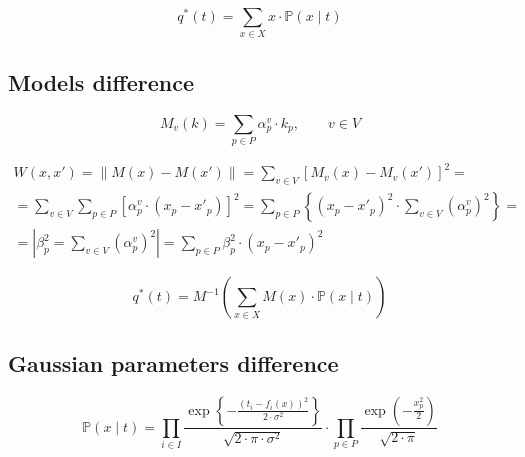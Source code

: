 \begin{equation*}
  q^* \left( t \right)
  = \sum_{x \in X} x \cdot \mathbb{P}\left( x \mid t \right)
\end{equation*}

\subsection{Models difference}

\begin{equation*}
  M_v\left( k \right) = \sum_{p \in P} \alpha_p^v \cdot k_p, \qquad v \in V
\end{equation*}

\begin{equation*}
    \begin{split}
      W \left( x, x' \right)
      = \left\| M\left( x \right) - M\left( x' \right) \right\|
      = \sum_{v \in V} \left[
          M_v\left( x \right) - M_v\left( x' \right)
        \right]^2 = \\
      = \sum_{v \in V} \sum_{p \in P} \left[
          \alpha_p^v \cdot \left( x_p - x'_p \right)
        \right]^2
      = \sum_{p \in P} \left\{ \left( x_p - x'_p \right)^2
        \cdot \sum_{v \in V} \left( \alpha_p^v \right)^2 \right\} = \\
      = \left| \beta_p^2 = \sum_{v \in V} \left( \alpha_p^v \right)^2 \right|
      = \sum_{p \in P}
          \beta_p^2 \cdot \left( x_p - x'_p \right)^2
    \end{split}
\end{equation*}

\begin{equation*}
  q^* \left( t \right)
  = M^{-1} \left(
      \sum_{x \in X} M\left( x \right) \cdot \mathbb{P}\left( x \mid t \right)
    \right)
\end{equation*}

\subsection{Gaussian parameters difference}

\begin{equation*}
  \mathbb{P}\left( x \mid t \right)
  = \prod_{i \in I}
    \frac{\exp{\left\{ - \frac{\left( t_i - f_i\left( x \right) \right)^2}
         {2 \cdot \sigma^2} \right\}}}{\sqrt{2 \cdot \pi \cdot \sigma^2}}
    \cdot
    \prod_{p \in P}
    \frac{\exp{\left( - \frac{x_p^2}{2} \right)}}{\sqrt{2 \cdot \pi}}
\end{equation*}

